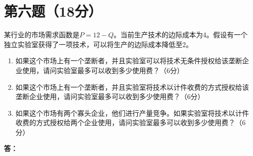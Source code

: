\documentclass[12pt]{article}
\begin{document}
\section*{第六题（18分）}
某行业的市场需求函数是$P=12-Q$。当前生产技术的边际成本为4。假设有一个独立实验室获得了一项技术，可以将生产的边际成本降低至2。

\begin{enumerate}
\item 如果这个市场上有一个垄断者，并且实验室可以将技术无条件授权给该垄断企业使用，请问实验室最多可以收到多少使用费？（6分）
\item 如果这个市场上有一个垄断者，并且实验室将技术以计件收费的方式授权给该垄断企业使用，请问实验室最多可以收到多少使用费？（6分）
\item 如果这个市场有两个寡头企业，他们进行产量竞争。如果实验室将技术以计件收费的方式授权给两个企业使用，请问实验室最多可以收到多少使用费？（6分）
\end{enumerate}

\noindent \textbf{答：}
\end{document}
